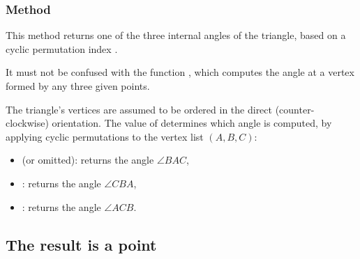 \subsubsection{Method }
\label{ssub:method_triangle_get_angle}

This method returns one of the three internal angles of the triangle, based on a cyclic permutation index .

\medskip
\noindent
It must not be confused with the function , which computes the angle at a vertex formed by any three given points.

\medskip
\noindent
The triangle's vertices are assumed to be ordered in the direct (counter-clockwise) orientation. The value of  determines which angle is computed, by applying cyclic permutations to the vertex list $(A, B, C)$:

\begin{itemize}
  \item {} (or omitted): returns the angle $∠BAC$,
  \item {}: returns the angle $∠CBA$,
  \item {}: returns the angle $∠ACB$.
\end{itemize}

\vspace{1em}


\begin{tkzexample}[latex=7cm]
\begin{center}
\end{center}
\end{tkzexample}




\subsection{The result is a point}

